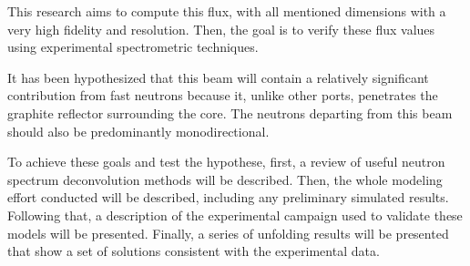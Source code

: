 This research aims to compute this flux, with all mentioned dimensions with a very high fidelity and resolution.
Then, the goal is to verify these flux values using experimental spectrometric techniques.

It has been hypothesized that this beam will contain a relatively significant contribution from fast neutrons because it, unlike other ports, penetrates the graphite reflector surrounding the core.
The neutrons departing from this beam should also be predominantly monodirectional.

To achieve these goals and test the hypothese, first, a review of useful neutron spectrum deconvolution methods will be described.
Then, the whole modeling effort conducted will be described, including any preliminary simulated results.
Following that, a description of the experimental campaign used to validate these models will be presented.
Finally, a series of unfolding results will be presented that show a set of solutions consistent with the experimental data.



